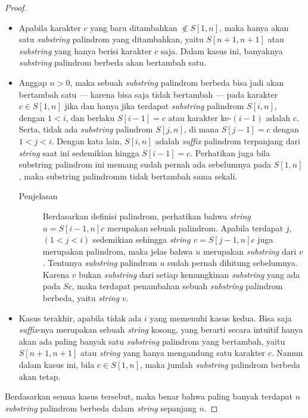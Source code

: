 \documentclass[11pt, a4paper, final]{article}
\begin{document}
\begin{proof}
\begin{itemize}
\item Apabila karakter $c$ yang baru ditambahkan $\notin S[1, n]$, maka hanya akan satu \textit{substring} palindrom yang ditambahkan, yaitu $S[n + 1, n+1]$ atau \textit{substring} yang hanya berisi karakter $c$ saja. Dalam kasus ini, banyaknya \textit{substring} palindrom berbeda akan bertambah satu.
\item Anggap $n > 0$, maka sebuah \textit{substring} palindrom berbeda bisa jadi akan bertambah satu --- karena bisa saja tidak bertambah --- pada karakter $c \in S[1,n]$ jika dan hanya jika terdapat \textit{substring} palindrom $S[i, n]$, dengan $1 < i$, dan berlaku $S[i - 1] = c$ atau karakter ke-$(i-1)$ adalah $c$. Serta, tidak ada \textit{substring} palindrom $S[j, n]$, di mana $S[j - 1] = c$ dengan $1 < j < i$. Dengan kata lain, $S[i, n]$ adalah \textit{suffix} palindrom terpanjang dari \textit{string} saat ini sedemikian hingga $S[i - 1] = c$. Perhatikan juga bila substring palindrom ini memang sudah pernah ada sebelumnya pada $S[1, n]$, maka substring palindromm tidak bertambah sama sekali.
  \begin{description}
  \item[Penjelasan]
    Berdasarkan definisi palindrom, perhatikan bahwa \textit{string} $u = S[i - 1, n]c$ merupakan sebuah palindrom. Apabila terdapat $j$, $(1 < j < i)$ sedemikian sehingga \textit{string} $v = S[j - 1, n]c$ juga merupakan palindrom, maka jelas bahwa $u$ merupakan \textit{substring} dari $v$. Tentunya \textit{substring} palindrom $u$ sudah pernah dihitung sebelumnya. Karena $v$ bukan \textit{substring} dari setiap kemungkinan \textit{substring} yang ada pada $Sc$, maka terdapat penambahan sebuah \textit{substring} palindrom berbeda, yaitu \textit{string} $v$.
  \end{description}
\item
  Kasus terakhir, apabila tidak ada $i$ yang memenuhi kasus kedua. Bisa saja \textit{suffix}-nya merupakan sebuah \textit{string} kosong, yang berarti secara intuitif hanya akan ada paling banyak satu \textit{substring} palindrom yang bertambah, yaitu $S[n+1, n+1]$ atau \textit{string} yang hanya mengandung satu karakter $c$. Namun dalam kasus ini, bila $c \in S[1, n]$, maka jumlah \textit{substring} palindrom berbeda akan tetap.
\end{itemize}

Berdasarkan semua kasus tersebut, maka benar bahwa paling banyak terdapat $n$ \textit{substring} palindrom berbeda dalam \textit{string} sepanjang $n$.
\end{proof}
\end{document}
